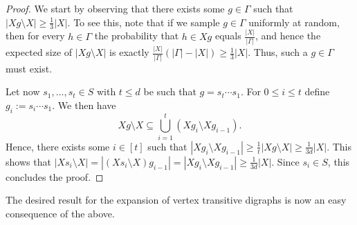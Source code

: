 \documentclass[english,11pt]{article}
\theoremstyle{definition}
\numberwithin{equation}{section}
\numberwithin{figure}{section}
\begin{document}
\begin{proof}
We start by observing that there exists some $g\in \Gamma$ such that $|Xg\setminus X|\ge \frac{1}{3}|X|$. 
To see this, note that if we sample $g\in \Gamma$ uniformly at random, then for every $h\in \Gamma$ the probability that $h\in Xg$ equals $\frac{|X|}{|\Gamma|}$, and hence the expected size of $|Xg\setminus X|$ is exactly $\frac{|X|}{|\Gamma|}(|\Gamma|-|X|)\ge \frac{1}{3}|X|$. Thus, such a $g\in\Gamma$ must exist.

Let now $s_1,\ldots,s_t\in S$ with $t\le d$ be such that $g=s_t\cdots s_1$. For $0\le i \le t$ define $g_i:=s_i\cdots s_1$. We then have 
$$Xg\setminus X\subseteq \bigcup_{i=1}^{t}(Xg_i\setminus Xg_{i-1}).$$
Hence, there exists some $i\in [t]$ such that $|Xg_i\setminus Xg_{i-1}|\ge \frac{1}{t}|Xg\setminus X|\ge \frac{1}{3d}|X|$. This shows that $|Xs_i\setminus X|=|(Xs_i\setminus X)g_{i-1}|=|Xg_i\setminus Xg_{i-1}|\ge \frac{1}{3d}|X|$. Since $s_i\in S$, this concludes the proof.
\end{proof}

The desired result for the expansion of vertex transitive digraphs is now an easy consequence of the above.
\end{document}
